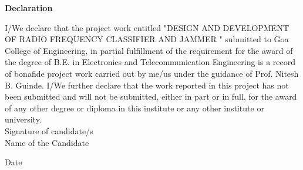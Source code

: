 \begin{center}
\begin{huge}
\bfseries{Declaration}\\
\end{huge}
\end{center}
\vspace{1cm}
I/We declare that the project work entitled "DESIGN AND DEVELOPMENT OF RADIO FREQUENCY CLASSIFIER AND JAMMER " submitted to Goa College of Engineering, in partial fulfillment of the requirement for the award of the degree of B.E. in Electronics and Telecommunication Engineering is a record of bonafide project work carried out by me/us under the guidance of Prof. Nitesh B. Guinde. I/We further declare that the work reported in this project has not been submitted and will not be submitted, either in part or in full, for the award of any other degree or diploma in this institute or any other institute or university.\\







\noindent Signature of candidate/s\\
\noindent Name of the Candidate








\noindent Date
